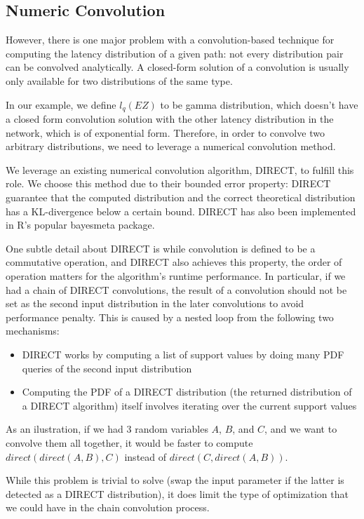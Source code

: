 \documentclass[10pt,sigconf,letterpaper,anonymous,nonacm]{acmart}
\begin{document}
\subsection{Numeric Convolution}
However, there is one major problem with a convolution-based technique for computing the latency distribution 
of a given path: not every distribution pair can be convolved analytically.
A closed-form solution of a convolution is usually only available for two distributions of the same type.

In our example, we define $l_q(EZ)$ to be gamma distribution, which doesn't have a closed form convolution 
solution with the other latency distribution in the network, which is of exponential form.
Therefore, in order to convolve two arbitrary distributions, we need to leverage a numerical convolution 
method.

We leverage an existing numerical convolution algorithm, DIRECT, to fulfill this role.
We choose this method due to their bounded error property: DIRECT guarantee that the computed 
distribution and the correct theoretical distribution has a KL-divergence below a certain bound.
DIRECT has also been implemented in R's popular bayesmeta package.

One subtle detail about DIRECT is while convolution is defined to be a commutative operation, and 
DIRECT also achieves this property, the order of operation matters for the algorithm's runtime 
performance.
In particular, if we had a chain of DIRECT convolutions, the result of a convolution should not be set 
as the second input distribution in the later convolutions to avoid performance penalty.
This is caused by a nested loop from the following two mechanisms:
\begin{itemize}
    \item DIRECT works by computing a list of support values by doing many PDF queries of the second input
        distribution
    \item Computing the PDF of a DIRECT distribution (the returned distribution of a DIRECT 
        algorithm) itself involves iterating over the current support values
\end{itemize}

As an ilustration, if we had 3 random variables $A$, $B$, and  $C$, and we want 
to convolve them all together, it would be faster to compute $direct(direct(A, B), C)$ instead of 
$direct(C, direct(A, B))$.

While this problem is trivial to solve (swap the input parameter if the latter is detected as a 
DIRECT distribution), it does limit the type of optimization that we could have in the chain convolution 
process.
\end{document}
